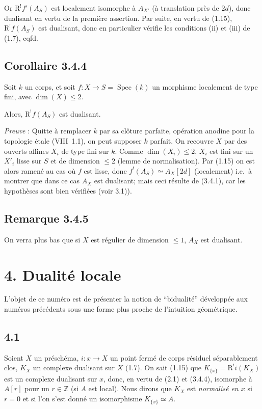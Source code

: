 \documentclass[11pt]{article}
\DeclareMathOperator{\Spec}{Spec}
\newcommand{\R}{\mathrm{R}}\newcommand{\RHomCore}{\mathrm{RHom}}
\newcommand{\Z}{\mathbb{Z}}
\providecommand{\R}{\mathrm R}
\providecommand{\Z}{\mathbb Z}
\providecommand{\Spec}{\operatorname{Spec}}
\providecommand{\Spec}{\operatorname{Spec}}
\providecommand{\Spec}{\operatorname{Spec}}
\providecommand{\Spec}{\operatorname{Spec}}
\begin{document}
Or $\R^{!}f'(A_S)$ est localement isomorphe à $A_{X'}$ (à translation près de $2d$), donc dualisant en vertu de la première assertion. Par suite, en vertu de (1.15), $\R^{!}f(A_S)$ est dualisant, donc en particulier vérifie les conditions (ii) et (iii) de (1.7), cqfd.

\subsection*{Corollaire 3.4.4}
Soit $k$ un corps, et soit $f : X \to S = \Spec(k)$ un morphisme localement de type fini, avec $\dim(X) \leqslant 2$.

Alors, $\R^{!}f(A_S)$ est dualisant.

\emph{Preuve} : Quitte à remplacer $k$ par sa clôture parfaite, opération anodine pour la topologie étale (VIII~1.1), on peut supposer $k$ parfait. On recouvre $X$ par des ouverts affines $X_i$ de type fini sur $k$. Comme $\dim(X_i) \leqslant 2$, $X_i$ est fini sur un $X'_i$ lisse sur $S$ et de dimension $\leqslant 2$ (lemme de normalisation). Par (1.15) on est alors ramené au cas où $f$ est lisse, donc $f^{!}(A_S) \simeq A_X[2d]$ (localement) i.e.~à montrer que dans ce cas $A_X$ est dualisant; mais ceci résulte de (3.4.1), car les hypothèses sont bien vérifiées (voir 3.1)).

\subsection*{Remarque 3.4.5}
On verra plus bas que si $X$ est régulier de dimension $\leqslant 1$, $A_X$ est dualisant.

\section*{4. Dualité locale}

L'objet de ce numéro est de présenter la notion de ``bidualité'' développée aux numéros précédents sous une forme plus proche de l'intuition géométrique.

\subsection*{4.1}
Soient $X$ un préschéma, $i:x\to X$ un point fermé de corps résiduel séparablement clos, $K_X$ un complexe dualisant sur $X$ (1.7). On sait (1.15) que $K_{\{x\}}=\R^{!}i(K_X)$ est un complexe dualisant sur $x$, donc, en vertu de (2.1) et (3.4.4), isomorphe à $A[r]$ pour un $r\in\Z$ (si $A$ est local). Nous dirons que $K_X$ est \emph{normalisé en $x$} si $r=0$ et si l'on s'est donné un isomorphisme $K_{\{x\}}\simeq A$.
\end{document}
